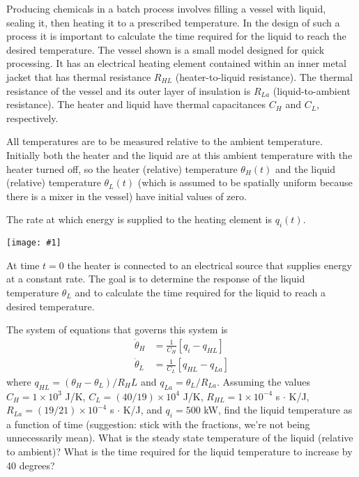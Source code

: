 \documentclass[12pt,letterpaper]{hmcpset}
\newcommand{\diagram}[2]{\begin{center}\texttt{[image: \#1]}\end{center}}
\begin{document}
	
	\begin{problem}[2]
		\setlength{\parskip}{3pt}
		Producing chemicals in a batch process involves filling a vessel with liquid, sealing it, then
		heating it to a prescribed temperature. In the design of such a process it is important to
		calculate the time required for the liquid to reach the desired temperature. The vessel shown
		is a small model designed for quick processing. It has an electrical heating element contained
		within an inner metal jacket that has thermal resistance $R_{HL}$ (heater-to-liquid resistance).
		The thermal resistance of the vessel and its outer layer of insulation is $R_{La}$ (liquid-to-ambient
		resistance). The heater and liquid have thermal capacitances $C_H$ and $C_L$, respectively.
		
		All temperatures are to be measured relative to the ambient temperature. Initially both the
		heater and the liquid are at this ambient temperature with the heater turned off, so the heater
		(relative) temperature $\theta_H (t)$ and the liquid (relative) temperature $\theta_L (t)$ (which is assumed to
		be spatially uniform because there is a mixer in the vessel) have initial values of zero.
		
		The rate at which energy is supplied to the heating element is $q_i (t)$.
		
		\diagram{Heater}{2}
		
		At time $t = 0$ the heater is connected to an electrical source that supplies energy at a constant
		rate. The goal is to determine the response of the liquid temperature $\theta_L$ and to calculate the
		time required for the liquid to reach a desired temperature.
		
		The system of equations that governs this system is
		\begin{displaymath}
		\begin{split}
		\Dot{\theta}_H &= \frac{1}{C_H} \left[ q_i - q_{HL} \right]\\
		\Dot{\theta}_L &= \frac{1}{C_L} \left[ q_{HL} - q_{La} \right]
		\end{split} 
		\end{displaymath}
		where $q_{HL} = (\theta_H - \theta_L)/R_HL$ and $q_{La} = \theta_L / R_{La}$. Assuming the values 
		$C_H = 1 \times 10^3$ J/K,
		$C_L = (40/19) \times 10^4$ J/K,
		$R_{HL} = 1 \times 10^{−4}$	s $\cdot$ K/J, 
		$R_{La} = (19/21) × 10^{−4}$ s $\cdot$ K/J, and
		$q_i = 500$ kW, 
		find the liquid temperature as a function of time (suggestion: stick with the
		fractions, we're not being unnecessarily mean). What is the steady state temperature of the
		liquid (relative to ambient)? What is the time required for the liquid temperature to increase
		by 40 degrees?
	\end{problem}
	
\end{document}
